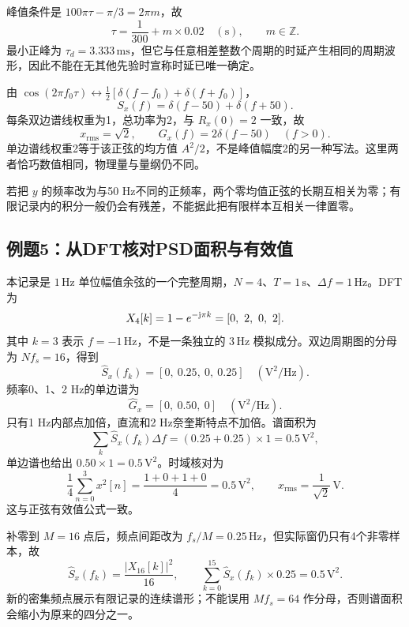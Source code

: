 峰值条件是 $100\pi\tau-\pi/3=2\pi m$，故
\[
\tau=\frac1{300}+m\times0.02\quad(\mathrm s),\qquad m\in\mathbb Z.
\]
最小正峰为 $\boxed{\tau_d=3.333\,\mathrm{ms}}$，但它与任意相差整数个周期的时延产生相同的周期波形，因此不能在无其他先验时宣称时延已唯一确定。

由 $\cos(2\pi f_0\tau)\leftrightarrow\tfrac12[\delta(f-f_0)+\delta(f+f_0)]$，
\[
\boxed{S_x(f)=\delta(f-50)+\delta(f+50)}.
\]
每条双边谱线权重为1，总功率为2，与 $R_x(0)=2$ 一致，故
\[
\boxed{x_{\mathrm{rms}}=\sqrt2},\qquad
G_x(f)=2\delta(f-50)\quad(f>0).
\]
单边谱线权重2等于该正弦的均方值 $A^2/2$，不是峰值幅度2的另一种写法。这里两者恰巧数值相同，物理量与量纲仍不同。

若把 $y$ 的频率改为与50 Hz不同的正频率，两个零均值正弦的长期互相关为零；有限记录内的积分一般仍会有残差，不能据此把有限样本互相关一律置零。

\Needspace{8cm}
\subsection{例题5：从DFT核对PSD面积与有效值}


\sol
本记录是 $1\,\mathrm{Hz}$ 单位幅值余弦的一个完整周期，$N=4$、$T=1\,\mathrm s$、$\Delta f=1\,\mathrm{Hz}$。DFT为
\[
X_4[k]=1-e^{-\iu\pi k}=[0,\ 2,\ 0,\ 2].
\]
其中 $k=3$ 表示 $f=-1\,\mathrm{Hz}$，不是一条独立的 $3\,\mathrm{Hz}$ 模拟成分。双边周期图的分母为 $Nf_s=16$，得到
\[
\boxed{\widehat S_x(f_k)=[0,\ 0.25,\ 0,\ 0.25]\quad(\mathrm{V^2/Hz})}.
\]
频率0、1、2 Hz的单边谱为
\[
\boxed{\widehat G_x=[0,\ 0.50,\ 0]\quad(\mathrm{V^2/Hz})}.
\]
只有1 Hz内部点加倍，直流和2 Hz奈奎斯特点不加倍。谱面积为
\[
\sum_k\widehat S_x(f_k)\Delta f
=(0.25+0.25)\times1=0.5\,\mathrm{V^2},
\]
单边谱也给出 $0.50\times1=0.5\,\mathrm{V^2}$。时域核对为
\[
\frac14\sum_{n=0}^{3}x^2[n]=\frac{1+0+1+0}{4}=0.5\,\mathrm{V^2},
\qquad \boxed{x_{\mathrm{rms}}=\frac1{\sqrt2}\,\mathrm V}.
\]
这与正弦有效值公式一致。

补零到 $M=16$ 点后，频点间距改为 $f_s/M=0.25\,\mathrm{Hz}$，但实际窗仍只有4个非零样本，故
\[
\boxed{\widehat S_x(f_k)=\frac{|X_{16}[k]|^2}{16}},\qquad
\boxed{\sum_{k=0}^{15}\widehat S_x(f_k)\times0.25=0.5\,\mathrm{V^2}}.
\]
新的密集频点展示有限记录的连续谱形；不能误用 $Mf_s=64$ 作分母，否则谱面积会缩小为原来的四分之一。

